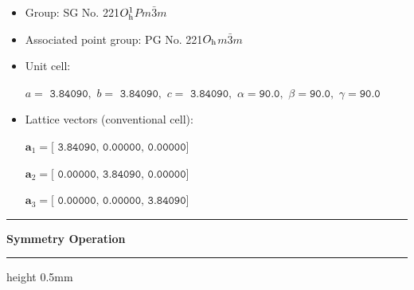 \documentclass[fleqn,10pt,landscape]{jsarticle}
\begin{document}
\begin{itemize}
\item Group: SG No. 221\quad$O_{\rm h}^{1}$\quad$Pm\bar{3}m$\quad[ cubic ]
\item Associated point group: PG No. 221\quad$O_{\rm h}$\quad$m\bar{3}m$\quad[ cubic ]
\end{itemize}
\begin{itemize}
\item Unit cell:

\quad $a=\texttt{ 3.84090},\,\, b=\texttt{ 3.84090},\,\, c=\texttt{ 3.84090},\,\, \alpha=\texttt{90.0},\,\, \beta=\texttt{90.0},\,\, \gamma=\texttt{90.0}$

\item Lattice vectors (conventional cell):

\quad $\bm{a}_1=\texttt{[ 3.84090, 0.00000, 0.00000]}$

\quad $\bm{a}_2=\texttt{[ 0.00000, 3.84090, 0.00000]}$

\quad $\bm{a}_3=\texttt{[ 0.00000, 0.00000, 3.84090]}$

\end{itemize}
\vspace{5mm}
\noindent \rule[0.5mm]{5mm}{0.5mm}\hspace{3mm}\textbf{Symmetry Operation}\hspace{3mm}\leaders\hrule height 0.5mm\hfill\kern0pt
\vspace{3mm}
\end{document}
